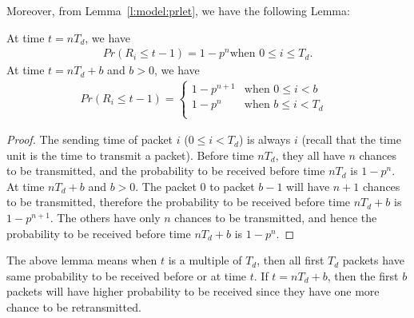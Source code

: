     Moreover, from Lemma~\ref{l:model:prlet}, we have the following Lemma: 
    \begin{lemma}
    \label{l:model:recv_td}
    At time $t = nT_d$, we have
    \begin{eqnarray*}
    Pr(R_i \leq t - 1) = 1 - p^n \textrm{when $0 \leq i \le T_d$.}
    \end{eqnarray*}
    At time $t = nT_d + b$ and $b>0$, we have
    \begin{eqnarray*}
        Pr(R_i \le t-1) = \left\{\begin{array}{ll}
        1 - p^{n+1} & \textrm{when $0 \le i < b$}\\
        1 - p^n     & \textrm{when $b \le i < T_d$ }\\
        \end{array}\right.
    \end{eqnarray*}
    \end{lemma}
    \begin{proof}
    The sending time of packet $i$ ($ 0 \leq i < T_d$) 
    is always $i$ (recall that the time unit is the time to transmit a packet). Before time $nT_d$, 
    they all have $n$ chances to be transmitted, and the probability to
    be received before time $nT_d$ is $1 - p^n$.
    At time $nT_d + b$ and $b >0$. The packet $0$ to packet $b-1$ will
    have $n+1$ chances to be transmitted, therefore the probability to be
    received before time $nT_d + b$ is $1 - p^{n+1}$. The others have only
    $n$ chances to be transmitted, and hence the probability to be
    received before time $nT_d + b$ is $1-p^n$. 
    \QED
    \end{proof}

    The above lemma means when $t$ is a multiple of $T_d$, then all first
    $T_d$ packets have same probability to be received before or at time $t$.
    If $t = nT_d + b$, then the first $b$ packets will have higher probability
    to be received since they have one more chance to be retransmitted.

